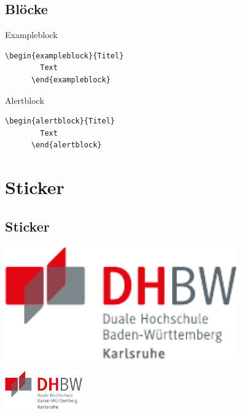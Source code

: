 \subsection{Blöcke}
\begin{frame}[fragile]{\subsecname}

  \begin{exampleblock}{Exampleblock}
    \begin{lstlisting}[gobble=6]
      \begin{exampleblock}{Titel}
        Text
      \end{exampleblock}
    \end{lstlisting}
  \end{exampleblock}

  \begin{alertblock}{Alertblock}
    \begin{lstlisting}[gobble=6]
      \begin{alertblock}{Titel}
        Text
      \end{alertblock}
    \end{lstlisting}
  \end{alertblock}

\end{frame}

\section{Sticker}

\subsection{Sticker}
\begin{frame}{\subsecname}

  \begin{sticker}[+1]
    \includegraphics[width=0.75\textwidth]{DHBW.pdf}
  \end{sticker}

  \begin{sidesticker}[-1]
    \includegraphics[width=0.25\textwidth]{DHBW.pdf}
  \end{sidesticker}

\end{frame}


